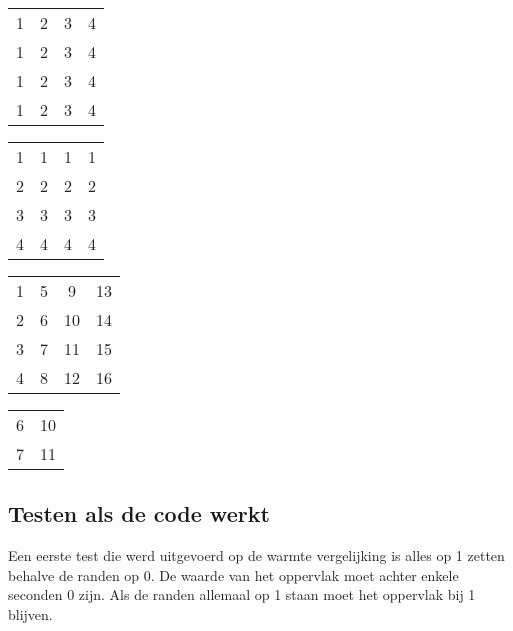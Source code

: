 \documentclass[11pt]{article} %
\begin{document}
\begin{minipage}[b]{0.25\linewidth}
	\begin{center}
		\begin{tabular}{ c c c c }
			1 & 2 & 3 & 4 \\
			1 & 2 & 3 & 4 \\
			1 & 2 & 3 & 4 \\
			1 & 2 & 3 & 4
		
		\end{tabular}
	\end{center}
\end{minipage}
\hspace{0.5cm}
\begin{minipage}[b]{0.25\linewidth}
	\begin{center}
		\begin{tabular}{ c c c c }
			1 & 1 & 1 & 1 \\
			2 & 2 & 2 & 2 \\
			3 & 3 & 3 & 3 \\
			4 & 4 & 4 & 4
		\end{tabular}
	\end{center}
\end{minipage}
\begin{minipage}[b]{0.25\linewidth}
	\begin{center}
		\begin{tabular}{ c c c c }
			1 & 5 & 9  & 13 \\
			2 & 6 & 10 & 14 \\
			3 & 7 & 11 & 15 \\
			4 & 8 & 12 & 16
		\end{tabular}
	\end{center}
\end{minipage}
\begin{minipage}[b]{0.25\linewidth}
		\begin{center}
			\begin{tabular}{ c  c }
		
				6 & 10 \\
				7 & 11 \\
		
			\end{tabular}
		\end{center}
\end{minipage}

\subsection{Testen als de code werkt}
Een eerste test die werd uitgevoerd op de warmte vergelijking is alles op 1 zetten behalve de randen op 0. De waarde van het oppervlak moet achter enkele seconden 0 zijn.  Als de randen allemaal op 1 staan moet het oppervlak bij 1 blijven.
\end{document}

